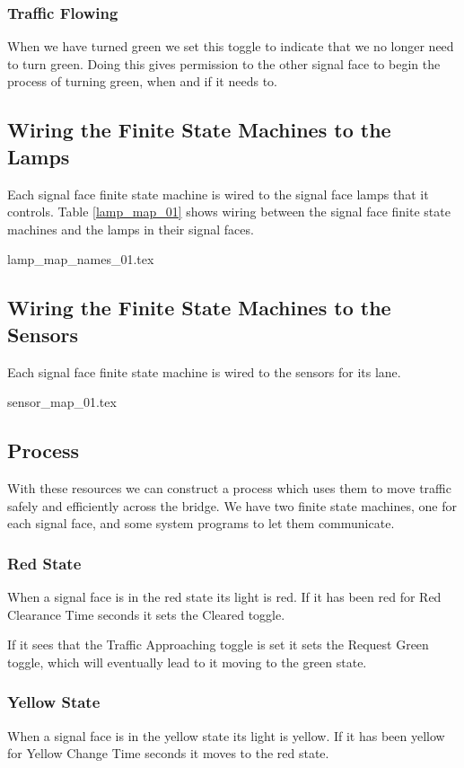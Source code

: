 \documentclass[letterpaper,twoside]{article}
\begin{document}
\subsubsection{Traffic Flowing}

When we have turned green we set this toggle to indicate
that we no longer need to turn green.  Doing this gives permission
to the other signal face to begin the process of turning green,
when and if it needs to.

\subsection{Wiring the Finite State Machines to the Lamps}

Each signal face finite state machine is wired to the signal face lamps that
it controls.  Table \ref{lamp_map_01} shows wiring between the signal
face finite state machines and the lamps in their signal faces.

 {lamp_map_names_01.tex}

\subsection{Wiring the Finite State Machines to the Sensors}

Each signal face finite state machine is wired to the sensors
for its lane.

 {sensor_map_01.tex}

\subsection{Process}

With these resources we can construct a process which uses them
to move traffic safely and efficiently across the bridge.
We have two finite state machines, one for each signal face,
and some system programs to let them communicate.

\subsubsection{Red State}
When a signal face is in the red state its light is red.  If it has
been red for Red Clearance Time seconds it sets the Cleared toggle.

If it sees that the Traffic Approaching toggle is set it sets
the Request Green toggle, which will eventually lead to it moving
to the green state.

\subsubsection{Yellow State}
When a signal face is in the yellow state its light is yellow.
If it has been yellow for Yellow Change Time seconds it moves
to the red state.
\end{document}
